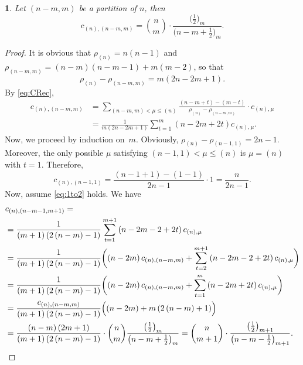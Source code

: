 \documentclass[10pt,oneside,american]{amsart}
\numberwithin{equation}{section}
\numberwithin{figure}{section}
\theoremstyle{plain}
\newtheorem{thm}{\protect\theoremname}[section]
\theoremstyle{definition}
\theoremstyle{remark}
\theoremstyle{plain}
\theoremstyle{definition}
\theoremstyle{plain}
\theoremstyle{plain}
\providecommand{\theoremname}{Theorem}
\begin{document}
\begin{thm}\label{thm:row1}
Let $\left(n-m,m\right)$ be a partition of $n$, then
\begin{equation}\label{eq:1to2}
  c_{\left(n\right),\left(n-m,m\right)} =
  \binom{n}{m}\cdot\frac{\bigl(\frac12\bigr)_m}{\bigl(n-m+\frac12\bigr)_m}.
\end{equation}
\end{thm}
\begin{proof}
It is obvious that $\rho_{\left(n\right)}=n\left(n-1\right)$ and $\rho_{\left(n-m,m\right)}=\left(n-m\right)\left(n-m-1\right)+m\left(m-2\right)$,
so that 
\[%
  \rho_{\left(n\right)}-\rho_{\left(n-m,m\right)}=m\left(2n-2m+1\right). \label{eq:coeff1to2}
\]%
By \eqref{eq:CRec},
\begin{align*}
  c_{\left(n\right),\left(n-m,m\right)}
  &= \sum_{\left(n-m,m\right)<\mu\leq\left(n\right)}\frac{\left(n-m+t\right)-\left(m-t\right)}
    {\rho_{\left(n\right)}-\rho_{\left(n-m,m\right)}}\cdot c_{\left(n\right),\mu} \\
  &= \frac{1}{m\left(2n-2m+1\right)}\sum_{t=1}^{m}\left(n-2m+2t\right)c_{\left(n\right),\mu}.
\end{align*}
Now, we proceed by induction on~$m$. Obviously, $ \rho_{\left(n\right)}-\rho_{\left(n-1,1\right)}=2n-1$. 
Moreover, the only possible $\mu$ satisfying $\left(n-1,1\right)<\mu\leq\left(n\right)$
is $\mu=\left(n\right)$ with $t=1$. Therefore, 
\begin{equation}\label{eq:cnton1}
  c_{\left(n\right),\left(n-1,1\right)}=\frac{\left(n-1+1\right)-\left(1-1\right)}{2n-1}\cdot1=\frac{n}{2n-1}.
\end{equation}
Now, assume \eqref{eq:1to2} holds. We have
\begin{align*}
 & c_{\left(n\right),\left(n-m-1,m+1\right)} = \\
 &= \frac{1}{\left(m+1\right)\left(2\left(n-m\right)-1\right)}\sum_{t=1}^{m+1}\left(n-2m-2+2t\right)c_{\left(n\right),\mu}\\
 &= \frac{1}{\left(m+1\right)\left(2\left(n-m\right)-1\right)}\biggl(\left(n-2m\right)c_{\left(n\right),\left(n-m,m\right)}+\sum_{t=2}^{m+1}\left(n-2m-2+2t\right)c_{\left(n\right),\mu}\biggr)\\
 &= \frac{1}{\left(m+1\right)\left(2\left(n-m\right)-1\right)}\biggl(\left(n-2m\right)c_{\left(n\right),\left(n-m,m\right)}+\sum_{t=1}^{m}\left(n-2m+2t\right)c_{\left(n\right),\mu}\biggr)\\
 &= \frac{c_{\left(n\right),\left(n-m,m\right)}}{\left(m+1\right)\left(2\left(n-m\right)-1\right)}\Bigl(\left(n-2m\right)+m\left(2\left(n-m\right)+1\right)\Bigr) \\
 &= \frac{\left(n-m\right)\left(2m+1\right)}{\left(m+1\right)\left(2\left(n-m\right)-1\right)}\cdot\binom{n}{m}\frac{\bigl(\frac12\bigr)_m}{\bigl(n-m+\frac12\bigr)_m}
 = \binom{n}{m+1}\cdot\frac{\bigl(\frac12\bigr)_{m+1}}{\bigl(n-m-\frac12\bigr)_{m+1}}.
\end{align*}
\end{proof}
\end{document}
